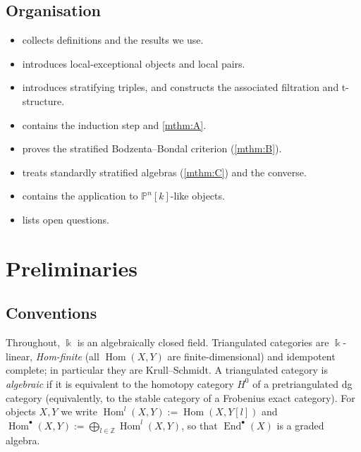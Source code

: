 \documentclass[11pt,reqno]{amsart}
\theoremstyle{plain}
\theoremstyle{definition}
\theoremstyle{remark}
\newcommand{\kk}{\Bbbk}
\DeclareMathOperator{\Hom}{Hom}
\DeclareMathOperator{\End}{End}
\newcommand{\Pn}[2]{\mathbb{P}^{#1}[#2]}
\begin{document}
\subsection*{Organisation}
\begin{itemize}
\item {} collects definitions and the results we use.
\item {} introduces local-exceptional objects and local pairs.
\item {} introduces stratifying triples, and constructs the associated filtration and t-structure.
\item {} contains the induction step and \cref{mthm:A}.
\item {} proves the stratified Bodzenta--Bondal criterion (\cref{mthm:B}).
\item {} treats standardly stratified algebras (\cref{mthm:C}) and the converse.
\item {} contains the application to $\Pn nk$-like objects.
\item {} lists open questions.
\end{itemize}

\section{Preliminaries}\label{sec:prelim}

\subsection{Conventions}\label{sec:conventions}
Throughout, $\kk$ is an algebraically closed field. Triangulated categories are $\kk$-linear, \emph{Hom-finite} (all $\Hom(X,Y)$ are finite-dimensional) and idempotent complete; in particular they are Krull--Schmidt. A triangulated category is \emph{algebraic} if it is equivalent to the homotopy category $H^0$ of a pretriangulated dg category (equivalently, to the stable category of a Frobenius exact category). For objects $X,Y$ we write $\Hom^l(X,Y):=\Hom(X,Y[l])$ and $\Hom^\bullet(X,Y):=\bigoplus_{l\in\mathbb{Z}}\Hom^l(X,Y)$, so that $\End^\bullet(X)$ is a graded algebra.
\end{document}
